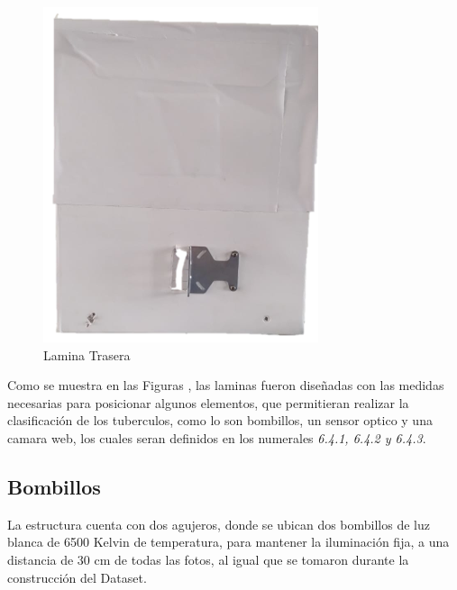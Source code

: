 \begin{figure}[ht]
\begin{minipage}[b]{0.25\linewidth}
				\includegraphics[width=\linewidth]{Figs/303.png}
				\caption{Lamina Trasera}
				\label{fig:trasera}
			\end{minipage}
		\end{figure}
				
		Como se muestra en las Figuras , las laminas fueron diseñadas con las medidas necesarias para posicionar algunos elementos, que permitieran realizar la clasificación de los tuberculos, como lo son bombillos, un sensor optico y una camara web, los cuales seran definidos en los numerales \textit{6.4.1, 6.4.2 y 6.4.3}.

		\subsection{Bombillos}
			La estructura cuenta con dos agujeros, donde se ubican dos bombillos de luz blanca de 6500 Kelvin de temperatura, para mantener la iluminación fija, a una distancia de 30 cm de todas las fotos, al igual que se tomaron durante la construcción del Dataset.

